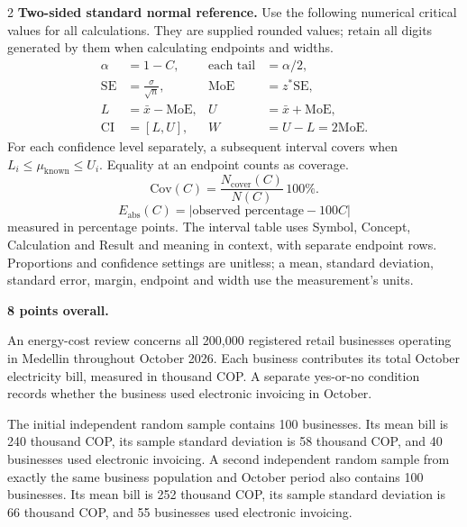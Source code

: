 \begin{multicols}{2}
\textbf{Two-sided standard normal reference.} Use the following numerical critical values for all calculations. They are supplied rounded values; retain all digits generated by them when calculating endpoints and widths.
\[
\begin{aligned}
\alpha&=1-C, &\text{each tail}&=\alpha/2,\\
\mathrm{SE}&=\frac{\sigma}{\sqrt n}, &\mathrm{MoE}&=z^*\mathrm{SE},\\
L&=\bar x-\mathrm{MoE}, &U&=\bar x+\mathrm{MoE},\\
\mathrm{CI}&=[L,U], &W&=U-L=2\mathrm{MoE}.
\end{aligned}
\]
For each confidence level separately, a subsequent interval covers when
$L_i\leq\mu_{\mathrm{known}}\leq U_i$. Equality at an endpoint counts as coverage.
\[
\mathrm{Cov}(C)=\frac{N_{\mathrm{cover}}(C)}{N(C)}\,100\%.
\]
\[
E_{\mathrm{abs}}(C)=|\text{observed percentage}-100C|
\]
measured in percentage points.
The interval table uses Symbol, Concept, Calculation and Result and meaning in context, with separate endpoint rows. Proportions and confidence settings are unitless; a mean, standard deviation, standard error, margin, endpoint and width use the measurement's units.

\endgroup
\begingroup\small
{}
\textbf{8 points overall.}

An energy-cost review concerns all 200,000 registered retail businesses operating in Medellin throughout October 2026. Each business contributes its total October electricity bill, measured in thousand COP. A separate yes-or-no condition records whether the business used electronic invoicing in October.

The initial independent random sample contains 100 businesses. Its mean bill is 240 thousand COP, its sample standard deviation is 58 thousand COP, and 40 businesses used electronic invoicing. A second independent random sample from exactly the same business population and October period also contains 100 businesses. Its mean bill is 252 thousand COP, its sample standard deviation is 66 thousand COP, and 55 businesses used electronic invoicing.


\end{multicols}
